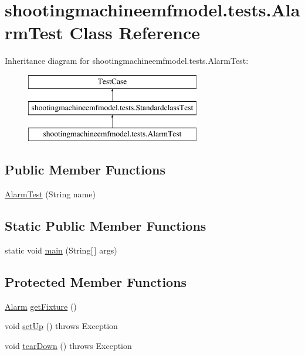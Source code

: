 \hypertarget{classshootingmachineemfmodel_1_1tests_1_1_alarm_test}{\section{shootingmachineemfmodel.\-tests.\-Alarm\-Test Class Reference}
\label{classshootingmachineemfmodel_1_1tests_1_1_alarm_test}
}
Inheritance diagram for shootingmachineemfmodel.\-tests.\-Alarm\-Test\-:\begin{figure}[H]
\begin{center}
\leavevmode
\includegraphics[height=3.000000cm]{classshootingmachineemfmodel_1_1tests_1_1_alarm_test}
\end{center}
\end{figure}
\subsection*{Public Member Functions}
\begin{DoxyCompactItemize}
\item 
\hyperlink{classshootingmachineemfmodel_1_1tests_1_1_alarm_test_a59dd8fb3a3d8831c4a2b98fd43ea861b}{Alarm\-Test} (String name)
\end{DoxyCompactItemize}
\subsection*{Static Public Member Functions}
\begin{DoxyCompactItemize}
\item 
static void \hyperlink{classshootingmachineemfmodel_1_1tests_1_1_alarm_test_a14ed41ac8de412bc25141ac27f0ed62c}{main} (String\mbox{[}$\,$\mbox{]} args)
\end{DoxyCompactItemize}
\subsection*{Protected Member Functions}
\begin{DoxyCompactItemize}
\item 
\hyperlink{interfaceshootingmachineemfmodel_1_1_alarm}{Alarm} \hyperlink{classshootingmachineemfmodel_1_1tests_1_1_alarm_test_a902b84da2d1ca2c99cf035a8d92be68b}{get\-Fixture} ()
\item 
void \hyperlink{classshootingmachineemfmodel_1_1tests_1_1_alarm_test_a5b671d15adb7b465aeac6ae69654a98f}{set\-Up} ()  throws Exception 
\item 
void \hyperlink{classshootingmachineemfmodel_1_1tests_1_1_alarm_test_a7e2003a1ddd62eba518cd900280bba1b}{tear\-Down} ()  throws Exception 
\end{DoxyCompactItemize}
